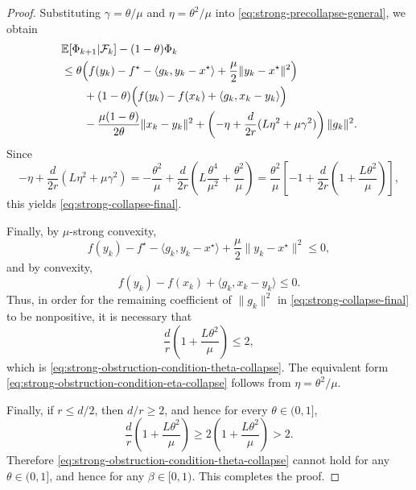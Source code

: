 \documentclass[10pt,a4paper]{amsart}
\begin{document}
\begin{proof}
Substituting \(\gamma=\theta/\mu\) and \(\eta=\theta^2/\mu\) into
\eqref{eq:strong-precollapse-general}, we obtain
\begin{align}
&\mathbb E\!\left[\Phi_{k+1}\middle|\mathcal F_k\right]-(1-\theta)\Phi_k
\notag\\
&\le
\theta\Bigl(
f(y_k)-f^\star-\langle g_k,y_k-x^\star\rangle+\frac{\mu}{2}\|y_k-x^\star\|^2
\Bigr)
\notag\\
&\qquad
+(1-\theta)\Bigl(
f(y_k)-f(x_k)+\langle g_k,x_k-y_k\rangle
\Bigr)
\notag\\
&\qquad
-\frac{\mu(1-\theta)}{2\theta}\|x_k-y_k\|^2
+\left(
-\eta+\frac{d}{2r}(L\eta^2+\mu\gamma^2)
\right)\|g_k\|^2.
\label{eq:strong-after-matching}
\end{align}
Since
\[
-\eta+\frac{d}{2r}(L\eta^2+\mu\gamma^2)
=
-\frac{\theta^2}{\mu}
+\frac{d}{2r}
\left(
L\frac{\theta^4}{\mu^2}
+
\frac{\theta^2}{\mu}
\right)
=
\frac{\theta^2}{\mu}
\left[
-1+\frac{d}{2r}\left(1+\frac{L\theta^2}{\mu}\right)
\right],
\]
this yields \eqref{eq:strong-collapse-final}.

Finally, by \(\mu\)-strong convexity,
\[
f(y_k)-f^\star-\langle g_k,y_k-x^\star\rangle+\frac{\mu}{2}\|y_k-x^\star\|^2\le 0,
\]
and by convexity,
\[
f(y_k)-f(x_k)+\langle g_k,x_k-y_k\rangle\le 0.
\]
Thus, in order for the remaining coefficient of \(\|g_k\|^2\) in
\eqref{eq:strong-collapse-final} to be nonpositive, it is necessary that
\[
\frac{d}{r}\left(1+\frac{L\theta^2}{\mu}\right)\le 2,
\]
which is \eqref{eq:strong-obstruction-condition-theta-collapse}. The equivalent form
\eqref{eq:strong-obstruction-condition-eta-collapse} follows from \(\eta=\theta^2/\mu\).

Finally, if \(r\le d/2\), then \(d/r\ge2\), and hence for every \(\theta\in(0,1]\),
\[
\frac{d}{r}\left(1+\frac{L\theta^2}{\mu}\right)
\ge
2\left(1+\frac{L\theta^2}{\mu}\right)
>
2.
\]
Therefore \eqref{eq:strong-obstruction-condition-theta-collapse} cannot hold for any
\(\theta\in(0,1]\), and hence for any \(\beta\in[0,1)\).
This completes the proof.

\end{proof}
\end{document}
